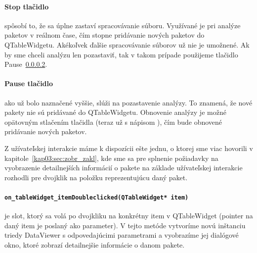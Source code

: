 \paragraph{Stop tlačidlo}

spôsobí to, že sa úplne zastaví spracovávanie súboru. Využívané je pri analýze paketov v reálnom čase, čím stopne pridávanie nových paketov do QTableWidgetu. Akékoľvek ďalšie spracovávanie súborov už nie je umožnené. Ak by sme chceli analýzu len pozastaviť, tak v takom prípade použijeme tlačidlo Pause~\ref{kap04:sec:pause_button}.

\paragraph{Pause tlačidlo}
\label{kap04:sec:pause_button}

ako už bolo naznačené vyššie, slúži na pozastavenie analýzy. To znamená, že nové pakety nie sú pridávané do QTableWidgetu. Obnovenie analýzy je možné opätovným stlačením tlačidla (teraz už s nápisom ), čím bude obnovené pridávanie nových paketov.

Z užívateľskej interakcie máme k dispozícii ešte jednu, o ktorej sme viac hovorili v kapitole~\ref{kap03:sec:zobr_zakl}, kde sme sa pre splnenie požiadavky na vyobrazenie detailnejších informácií o pakete na základe užívateľskej interakcie rozhodli pre dvojklik na položku reprezentujúcu daný paket.

\paragraph{\texttt{on\_tableWidget\_itemDoubleclicked(QTableWidget* item)}}

je slot, ktorý sa volá po dvojkliku na konkrétny item v QTableWidget (pointer na daný item je poslaný ako parameter). V tejto metóde vytvoríme novú inštanciu triedy DataViewer s odpovedajúcimi parametrami a vyobrazíme jej dialógové okno, ktoré zobrazí detailnejšie informácie o danom pakete.






























